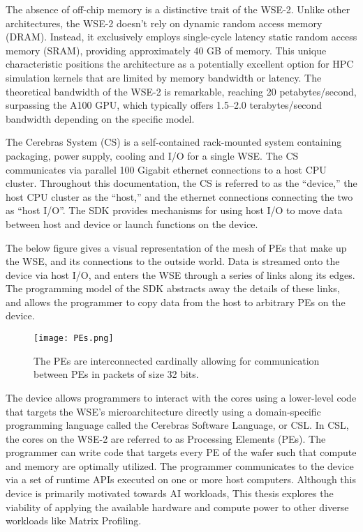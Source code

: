 The absence of off-chip memory is a distinctive trait of the WSE-2. Unlike other architectures, the WSE-2 doesn't rely on dynamic random access memory (DRAM). Instead, it exclusively employs single-cycle latency static random access memory (SRAM), providing approximately 40 GB of memory. This unique characteristic positions the architecture as a potentially excellent option for HPC simulation kernels that are limited by memory bandwidth or latency. The theoretical bandwidth of the WSE-2 is remarkable, reaching 20 petabytes/second, surpassing the A100 GPU, which typically offers 1.5–2.0 terabytes/second bandwidth depending on the specific model.

The Cerebras System (CS) is a self-contained rack-mounted system containing packaging, power supply, cooling and I/O for a single WSE. The CS communicates via parallel 100 Gigabit ethernet connections to a host CPU cluster. Throughout this documentation, the CS is referred to as the “device,” the host CPU cluster as the “host,” and the ethernet connections connecting the two as “host I/O”. The SDK provides mechanisms for using host I/O to move data between host and device or launch functions on the device.

The below figure gives a visual representation of the mesh of PEs that make up the WSE, and its connections to the outside world. Data is streamed onto the device via host I/O, and enters the WSE through a series of links along its edges. The programming model of the SDK abstracts away the details of these links, and allows the programmer to copy data from the host to arbitrary PEs on the device.

\begin{figure}[h!]
    \texttt{[image: PEs.png]}
    \centering
    \caption{The PEs are interconnected cardinally allowing for communication between PEs in packets of size 32 bits.}
\end{figure}


The device allows programmers to interact with the cores using a lower-level code that targets the WSE's microarchitecture directly
using a domain-specific programming language called the Cerebras Software Language, or CSL. In CSL, the cores on the WSE-2 are referred to as Processing Elements (PEs). The programmer
can write code that targets every PE of the wafer such that compute and memory are optimally
utilized. The programmer communicates to the device via a set of runtime APIs executed on one
or more host computers.
Although this device is primarily motivated towards AI workloads, This thesis explores the viability of applying the available hardware and compute power to other diverse workloads like Matrix Profiling.\\

